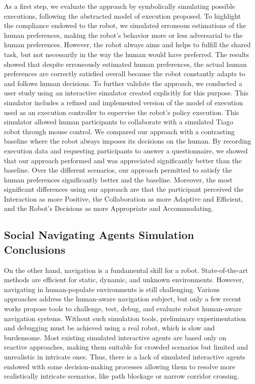 As a first step, we evaluate the approach by symbolically simulating possible executions, following the abstracted model of execution proposed. To highlight the compliance endowed to the robot, we simulated erroneous estimations of the human preferences, making the robot's behavior more or less adversarial to the human preferences. However, the robot always aims and helps to fulfill the shared task, but not necessarily in the way the human would have preferred. The results showed that despite erroneously estimated human preferences, the actual human preferences are correctly satisfied overall because the robot constantly adapts to and follows human decisions. 
To further validate the approach, we conducted a user study using an interactive simulator created explicitly for this purpose. This simulator includes a refined and implemented version of the model of execution used as an execution controller to supervise the robot's policy execution. This simulator allowed human participants to collaborate with a simulated Tiago robot through mouse control. We compared our approach with a contrasting baseline where the robot always imposes its decisions on the human. By recording execution data and requesting participants to answer a questionnaire, we showed that our approach performed and was appreciated significantly better than the baseline. Over the different scenarios, our approach permitted to satisfy the human preferences significantly better and the baseline. 
Moreover, the most significant differences using our approach are that the participant perceived the Interaction as more Positive, the Collaboration as more Adaptive and Efficient, and the Robot's Decisions as more Appropriate and Accommodating.    

\subsection*{Social Navigating Agents Simulation Conclusions}

On the other hand, navigation is a fundamental skill for a robot. State-of-the-art methods are efficient for static, dynamic, and unknown environments. However, navigating in human-populate environments is still challenging. Various approaches address the human-aware navigation subject, but only a few recent works propose tools to challenge, test, debug, and evaluate robot human-aware navigation systems. Without such simulation tools, preliminary experimentation and debugging must be achieved using a real robot, which is slow and burdensome. 
Most existing simulated interactive agents are based only on reactive approaches, making them suitable for crowded scenarios but limited and unrealistic in intricate ones. 
Thus, there is a lack of simulated interactive agents endowed with some decision-making processes allowing them to resolve more realistically intricate scenarios, like path blockage or narrow corridor crossing.


